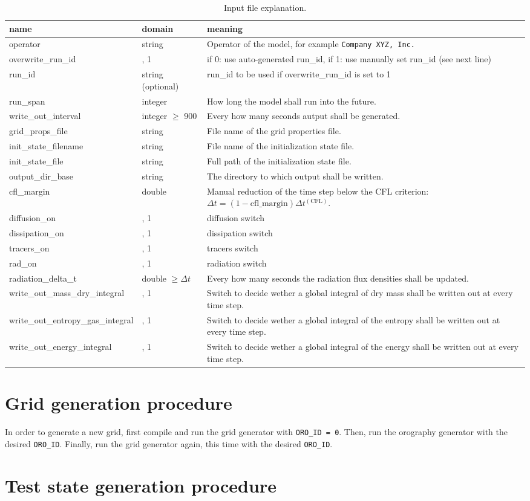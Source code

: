 \documentclass{article}
\begin{document}
\renewcommand{\arraystretch}{1.2}
\begin{table}
\centering
\begin{tabular}{|>{\centering}p{4.0 cm}|>{\centering}p{3 cm}|>{\centering}p{7 cm}|}
\hline \textbf{name} & \textbf{domain} & \textbf{meaning} \tabularnewline
\hline\hline operator & string & Operator of the model, for example \texttt{Company XYZ, Inc.} \tabularnewline
\hline overwrite\_run\_id & 0, 1 & if 0: use auto-generated run\_id, if 1: use manually set run\_id (see next line) \tabularnewline
\hline run\_id & string (optional) & run\_id to be used if overwrite\_run\_id is set to 1 \tabularnewline
\hline run\_span & integer & How long the model shall run into the future. \tabularnewline
\hline write\_out\_interval & integer $\geq$ 900 & Every how many seconds autput shall be generated. \tabularnewline
\hline grid\_props\_file & string & File name of the grid properties file. \tabularnewline
\hline init\_state\_filename & string & File name of the initialization state file. \tabularnewline
\hline init\_state\_file & string & Full path of the initialization state file. \tabularnewline
\hline output\_dir\_base & string & The directory to which output shall be written. \tabularnewline
\hline cfl\_margin & double & Manual reduction of the time step below the CFL criterion: $\Delta t = \left(1 - \text{cfl\_margin}\right)\Delta t^{(\text{CFL})}$. \tabularnewline
\hline diffusion\_on & 0, 1 & diffusion switch \tabularnewline
\hline dissipation\_on & 10, 1 & dissipation switch \tabularnewline
\hline tracers\_on & 0, 1 & tracers switch \tabularnewline
\hline rad\_on & 0, 1 & radiation switch \tabularnewline
\hline radiation\_delta\_t & double $\geq \Delta t$ & Every how many seconds the radiation flux densities shall be updated.  \tabularnewline
\hline write\_out\_mass\_dry\_integral & 0, 1 & Switch to decide wether a global integral of dry mass shall be written out at every time step. \tabularnewline
\hline write\_out\_entropy\_gas\_integral & 0, 1 & Switch to decide wether a global integral of the entropy shall be written out at every time step. \tabularnewline
\hline write\_out\_energy\_integral & 0, 1 & Switch to decide wether a global integral of the energy shall be written out at every time step. \tabularnewline
\hline 
\end{tabular}
\caption{Input file explanation.}
\label{tab:input_file_explanation}
\end{table}
\renewcommand{\arraystretch}{1}

\section{Grid generation procedure}
\label{sec:grid_generation_procedure}

In order to generate a new grid, first compile and run the grid generator with \texttt{ORO\_ID = 0}. Then, run the orography generator with the desired \texttt{ORO\_ID}. Finally, run the grid generator again, this time with the desired \texttt{ORO\_ID}.

\section{Test state generation procedure}
\label{sec:test_state_generation_procedure}
\end{document}

